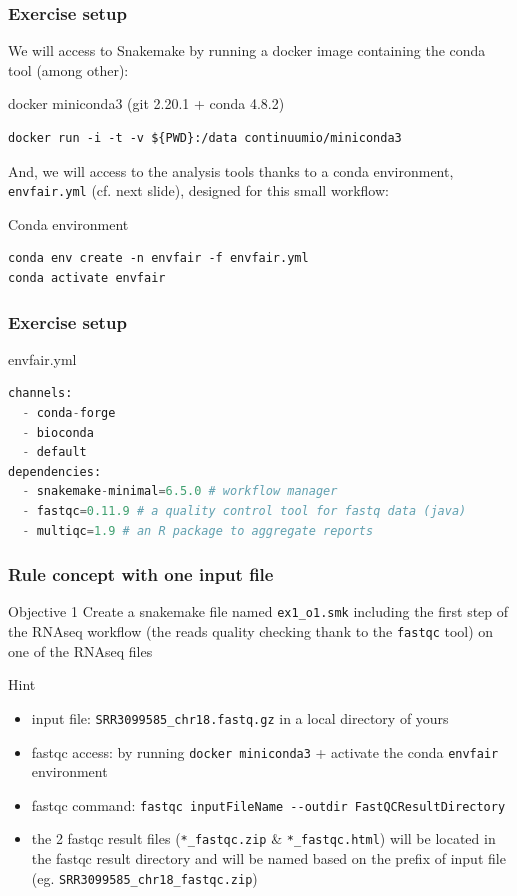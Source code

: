 \begin{frame}[containsverbatim]
\frametitle{Exercise setup}
We will access to Snakemake by running a docker image containing the conda tool (among other):
\begin{exampleblock}{docker miniconda3 (git 2.20.1 + conda 4.8.2)}
\begin{lstlisting}
docker run -i -t -v ${PWD}:/data continuumio/miniconda3
\end{lstlisting}
\end{exampleblock}
And, we will access to the analysis tools thanks to a conda environment, \verb|envfair.yml| (cf. next slide), designed for this small workflow:
\begin{exampleblock}{Conda environment}
\begin{lstlisting}
conda env create -n envfair -f envfair.yml
conda activate envfair
\end{lstlisting}
\end{exampleblock}
\end{frame}
\begin{frame}[containsverbatim]
\frametitle{Exercise setup}
\begin{exampleblock}{envfair.yml}
\begin{lstlisting}[language=python]
channels:
  - conda-forge
  - bioconda
  - default
dependencies:
  - snakemake-minimal=6.5.0 # workflow manager
  - fastqc=0.11.9 # a quality control tool for fastq data (java)
  - multiqc=1.9 # an R package to aggregate reports
\end{lstlisting}
\end{exampleblock}
\end{frame}
\begin{frame}[containsverbatim]
\frametitle{Rule concept with one input file}
\begin{exampleblock}{Objective 1}
Create a snakemake file named \verb|ex1_o1.smk| including the first step of the RNAseq workflow (the reads quality checking thank to the \verb|fastqc| tool) on one of the RNAseq files
\end{exampleblock}
\begin{exampleblock}{Hint}
\begin{itemize}
    \item input file: \verb|SRR3099585_chr18.fastq.gz| in a local directory of yours
    \item fastqc access: by running \verb|docker miniconda3| + activate the conda \verb|envfair| environment
    \item fastqc command: \verb|fastqc inputFileName --outdir FastQCResultDirectory|
    \item the 2 fastqc result files (\verb|*_fastqc.zip| \& \verb|*_fastqc.html|) will be located in the fastqc result directory and will be named based on the prefix of input file (eg. \verb|SRR3099585_chr18_fastqc.zip|)
\end{itemize}
\end{exampleblock}
\end{frame}
